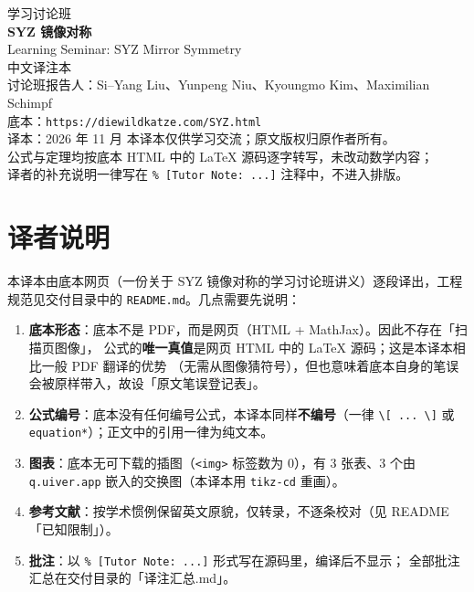 \begin{titlepage}
\centering
\vspace*{2.2cm}
{\Large 学习讨论班}\\[1.0em]
{\Huge\bfseries SYZ 镜像对称}\\[0.7em]
{\large Learning Seminar: SYZ Mirror Symmetry}\\[2.2em]
{\Large 中文译注本}\\[1.6em]
{\normalsize
讨论班报告人：Si--Yang Liu、Yunpeng Niu、Kyoungmo Kim、Maximilian Schimpf\\[0.6em]
底本：\texttt{https://diewildkatze.com/SYZ.html}\\[0.6em]
译本：2026 年 11 月}
\vfill
{\small 本译本仅供学习交流；原文版权归原作者所有。\\
公式与定理均按底本 HTML 中的 \LaTeX{} 源码逐字转写，未改动数学内容；\\
译者的补充说明一律写在 \texttt{\% [Tutor Note: ...]} 注释中，不进入排版。}
\end{titlepage}

\thispagestyle{empty}
\section*{译者说明}

本译本由底本网页（一份关于 SYZ 镜像对称的学习讨论班讲义）逐段译出，工程规范见交付目录中的
\texttt{README.md}。几点需要先说明：

\begin{enumerate}[leftmargin=1.6em,itemsep=2pt]
  \item \textbf{底本形态}：底本不是 PDF，而是网页（HTML + MathJax）。因此不存在「扫描页图像」，
        公式的\textbf{唯一真值}是网页 HTML 中的 \LaTeX{} 源码；这是本译本相比一般 PDF 翻译的优势
        （无需从图像猜符号），但也意味着底本自身的笔误会被原样带入，故设「原文笔误登记表」。
  \item \textbf{公式编号}：底本没有任何编号公式，本译本同样\textbf{不编号}（一律
        \verb|\[ ... \]| 或 \verb|equation*|）；正文中的引用一律为纯文本。
  \item \textbf{图表}：底本无可下载的插图（\texttt{<img>} 标签数为 0），有 3 张表、3 个由
        \texttt{q.uiver.app} 嵌入的交换图（本译本用 \texttt{tikz-cd} 重画）。
  \item \textbf{参考文献}：按学术惯例保留英文原貌，仅转录，不逐条校对（见 README「已知限制」）。
  \item \textbf{批注}：以 \texttt{\% [Tutor Note: ...]} 形式写在源码里，编译后不显示；
        全部批注汇总在交付目录的「译注汇总.md」。
\end{enumerate}

\clearpage
\tableofcontents
\clearpage
